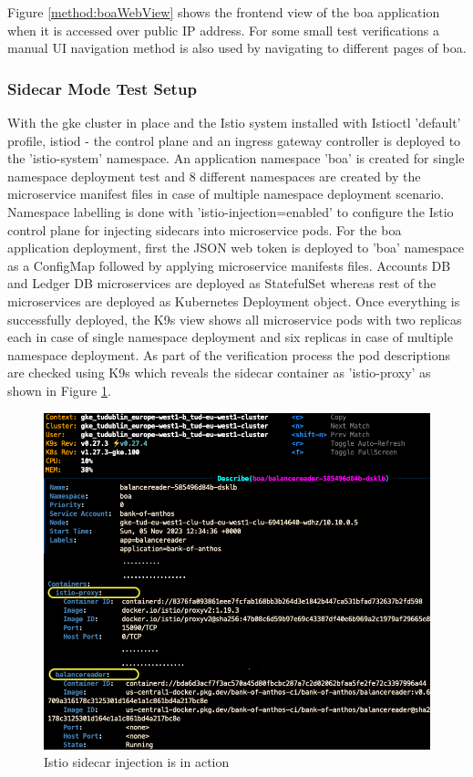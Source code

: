 Figure \ref{method:boaWebView} shows the frontend view of the \acrshort{boa} application when it is accessed over public IP address. For some small test verifications a manual UI navigation method is also used by navigating to different pages of \acrshort{boa}.


\subsubsection{Sidecar Mode Test Setup}
With the \acrshort{gke} cluster in place and the Istio system installed with Istioctl 'default' profile, istiod - the control plane and an ingress gateway controller is deployed to the 'istio-system' namespace. An application namespace 'boa' is created for single namespace deployment test and 8 different namespaces are created by the microservice manifest files in case of multiple namespace deployment scenario. Namespace labelling is done with 'istio-injection=enabled' to configure the Istio control plane for injecting sidecars into microservice pods. For the \acrshort{boa} application deployment, first the JSON web token is deployed to 'boa' namespace as a ConfigMap followed by applying microservice manifests files. Accounts DB and Ledger DB microservices are deployed as StatefulSet whereas rest of the microservices are deployed as Kubernetes Deployment object. Once everything is successfully deployed, the K9s view shows all microservice pods with two replicas each in case of single namespace deployment and six replicas in case of multiple namespace deployment. As part of the verification process the pod descriptions are checked using K9s which reveals the sidecar container as 'istio-proxy' as shown in Figure \ref{method:istioSidecarInjectionView}.

\begin{figure}[ht!]
  \centering
  \includegraphics[width=1.0\linewidth]{resources/istio-sidecar-injection.png}
  \caption{Istio sidecar injection is in action}
  \label{method:istioSidecarInjectionView}
\end{figure}

